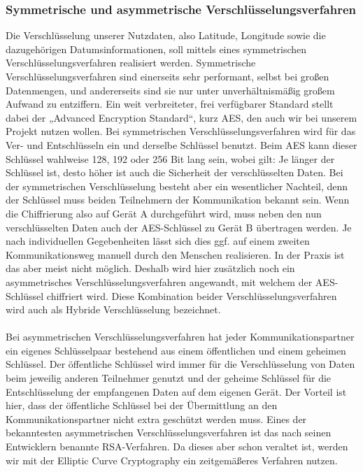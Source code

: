 \subsubsection{Symmetrische und asymmetrische Verschlüsselungsverfahren }
Die Verschlüsselung unserer Nutzdaten, also Latitude, Longitude sowie die dazugehörigen Datumsinformationen, soll mittels eines symmetrischen Verschlüsselungsverfahren realisiert werden. Symmetrische Verschlüsselungsverfahren sind einerseits sehr performant, selbst bei großen Datenmengen, und andererseits sind sie nur unter unverhältnismäßig großem Aufwand zu entziffern. Ein weit verbreiteter, frei verfügbarer Standard stellt dabei der „Advanced Encryption Standard“, kurz AES, den auch wir bei unserem Projekt nutzen wollen. Bei symmetrischen Verschlüsselungsverfahren wird für das Ver- und Entschlüsseln ein und derselbe Schlüssel benutzt. Beim AES kann dieser Schlüssel wahlweise 128, 192 oder 256 Bit lang sein, wobei gilt: Je länger der Schlüssel ist, desto höher ist auch die Sicherheit der verschlüsselten Daten. Bei der symmetrischen Verschlüsselung besteht aber ein wesentlicher Nachteil, denn der Schlüssel muss beiden Teilnehmern der Kommunikation bekannt sein. Wenn die Chiffrierung also auf Gerät A durchgeführt wird, muss neben den nun verschlüsselten Daten auch der AES-Schlüssel zu Gerät B übertragen werden. Je nach individuellen Gegebenheiten lässt sich dies ggf. auf einem zweiten Kommunikationsweg manuell durch den Menschen realisieren. In der Praxis ist das aber meist nicht möglich. Deshalb wird hier zusätzlich noch ein asymmetrisches Verschlüsselungsverfahren angewandt, mit welchem der AES-Schlüssel chiffriert wird. Diese Kombination beider Verschlüsselungsverfahren wird auch als Hybride Verschlüsselung bezeichnet.
\\
\\
Bei asymmetrischen Verschlüsselungsverfahren hat jeder Kommunikationspartner ein eigenes Schlüsselpaar bestehend aus einem öffentlichen und einem geheimen Schlüssel. Der öffentliche Schlüssel wird immer für die Verschlüsselung von Daten beim jeweilig anderen Teilnehmer genutzt und der geheime Schlüssel für die Entschlüsselung der empfangenen Daten auf dem eigenen Gerät. Der Vorteil ist hier, dass der öffentliche Schlüssel bei der Übermittlung an den Kommunikationspartner nicht extra geschützt werden muss. Eines der bekanntesten asymmetrischen Verschlüsselungsverfahren ist das nach seinen Entwicklern benannte RSA-Verfahren. Da dieses aber schon veraltet ist, werden wir mit der Elliptic Curve Cryptography ein zeitgemäßeres Verfahren nutzen.

